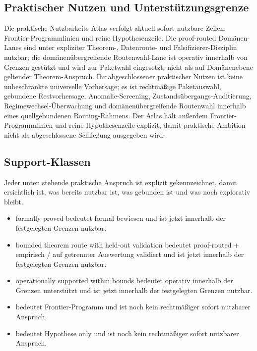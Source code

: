 \subsection{Praktischer Nutzen und Unterstützungsgrenze}
Die praktische Nutzbarkeits-Atlas verfolgt aktuell  sofort nutzbare Zeilen,  Frontier-Programmlinien und  reine Hypothesenzeile.
Die proof-routed Domänen-Lanes sind unter expliziter Theorem-, Datenroute- und Falsifizierer-Disziplin nutzbar; die domänenübergreifende Routenwahl-Lane ist operativ innerhalb von Grenzen gestützt und wird zur Paketwahl eingesetzt, nicht als auf Domänenebene geltender Theorem-Anspruch.
Ihr abgeschlossener praktischer Nutzen ist keine unbeschränkte universelle Vorhersage; es ist rechtmäßige Paketauswahl, gebundene Restvorhersage, Anomalie-Screening, Zustandsübergangs-Auditierung, Regimewechsel-Überwachung und domänenübergreifende Routenwahl innerhalb eines quellgebundenen Routing-Rahmens.
Der Atlas hält außerdem  Frontier-Programmlinien und  reine Hypothesenzeile explizit, damit praktische Ambition nicht als abgeschlossene Schließung ausgegeben wird.

\subsection{Support-Klassen}
Jeder unten stehende praktische Anspruch ist explizit gekennzeichnet, damit ersichtlich ist, was bereits nutzbar ist, was gebunden ist und was noch explorativ bleibt.
\begin{itemize}[leftmargin=1.6em,nosep]
\item formally proved bedeutet formal bewiesen und ist jetzt innerhalb der festgelegten Grenzen nutzbar.
\item bounded theorem route with held-out validation bedeutet proof-routed + empirisch / auf getrennter Auswertung validiert und ist jetzt innerhalb der festgelegten Grenzen nutzbar.
\item operationally supported within bounds bedeutet operativ innerhalb der Grenzen unterstützt und ist jetzt innerhalb der festgelegten Grenzen nutzbar.
\item {} bedeutet Frontier-Programm und ist noch kein rechtmäßiger sofort nutzbarer Anspruch.
\item {} bedeutet Hypothese only und ist noch kein rechtmäßiger sofort nutzbarer Anspruch.
\end{itemize}

